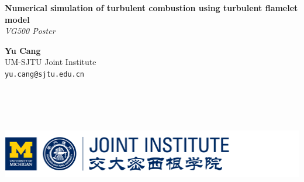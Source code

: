\documentclass[a0,portrait]{a0poster}
\begin{document}


\begin{minipage}[b]{\linewidth}

\Huge \color{NavyBlue} \textbf{Numerical simulation of turbulent combustion using turbulent flamelet model} \color{Black}\\ %
\vspace{0.5cm}
\Huge\textit{VG500 Poster}\\[-2cm] %

\setlength\columnseprule{0pt}
\begin{multicols}{2}
	\huge \textbf{Yu Cang}\\[0.5cm] %
	\LARGE UM-SJTU Joint Institute\\[0.4cm] %
	\Large \texttt{yu.cang@sjtu.edu.cn}\\
	
	\columnbreak

	\includegraphics[height=6cm]{pic/JI_logo}\\
\end{multicols}


\end{minipage}
%


\vspace{1cm} %

\end{document}

